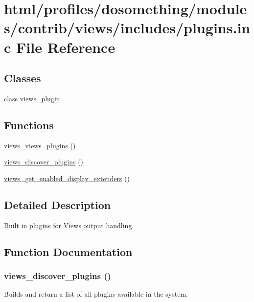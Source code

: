 \hypertarget{views_2includes_2plugins_8inc}{
\section{html/profiles/dosomething/modules/contrib/views/includes/plugins.inc File Reference}
\label{views_2includes_2plugins_8inc}
}
\subsection*{Classes}
\begin{DoxyCompactItemize}
\item 
class \hyperlink{classviews__plugin}{views\_\-plugin}
\end{DoxyCompactItemize}
\subsection*{Functions}
\begin{DoxyCompactItemize}
\item 
\hyperlink{views_2includes_2plugins_8inc_a89b4d3bd8e15dca9a33e85b203218b8d}{views\_\-views\_\-plugins} ()
\item 
\hyperlink{views_2includes_2plugins_8inc_ac694df6695d73aa943913be2707516f5}{views\_\-discover\_\-plugins} ()
\item 
\hyperlink{views_2includes_2plugins_8inc_a6ffdbd1645ea104a3e95303c05bde2f2}{views\_\-get\_\-enabled\_\-display\_\-extenders} ()
\end{DoxyCompactItemize}


\subsection{Detailed Description}
Built in plugins for Views output handling. 

\subsection{Function Documentation}
\hypertarget{views_2includes_2plugins_8inc_ac694df6695d73aa943913be2707516f5}{
\subsubsection[{views\_\-discover\_\-plugins}]{\setlength{\rightskip}{0pt plus 5cm}views\_\-discover\_\-plugins ()}}
\label{views_2includes_2plugins_8inc_ac694df6695d73aa943913be2707516f5}
Builds and return a list of all plugins available in the system.


